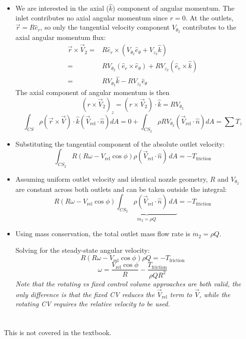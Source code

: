 ﻿\documentclass[12pt]{article}
\begin{document}
\begin{examplebox}
\begin{itemize}
\item We are interested in the axial ($\hat{k}$) component of angular momentum. The inlet contributes no axial angular momentum since $r=0$. At the outlets, $\vec{r}=R\hat{e}_r$, so only the tangential velocity component $V_{\theta_2}$ contributes to the axial angular momentum flux:
\begin{align*}
\vec r\times\vec V_2=&R\hat e_r\times(V_{\theta_2}\hat e_\theta+V_{z_2}\hat k)\\
=&RV_{\theta_2}(\hat e_r\times\hat e_\theta)+RV_{z_2}(\hat e_r\times\hat k)\\
=&RV_{\theta_2}\hat k-RV_{z_2}\hat e_\theta
\end{align*}
The axial component of angular momentum is then
\[(r\times\vec V_2)_z = (r\times\vec V_2)\cdot\hat{k} = RV_{\theta_2}\]
\[\int_{CS} \rho\left(\vec{r}\times\vec{V}\right)\cdot\hat{k}\left(\vec{V}_{\mathrm{rel}}\cdot\hat{n}\right)dA
=0+\int_{CS_2}\rho RV_{\theta_2}\left(\vec{V}_{\mathrm{rel}}\cdot\hat{n}\right)dA
=\sum T_z\]

\item Substituting the tangential component of the absolute outlet velocity:
\[\int_{CS_2} R(R\omega-V_{\mathrm{rel}}\cos\phi)\rho
(\vec{V}_{\mathrm{rel}}\cdot\hat{n})\,dA
=-T_{\mathrm{friction}}\]
    \item Assuming uniform outlet velocity and identical nozzle geometry, $R$ and $V_{\theta_2}$ are constant across both outlets and can be taken outside the integral:
\[R(R\omega-V_{\mathrm{rel}}\cos\phi)
\underbrace{\int_{CS_2}\rho
(\vec{V}_{\mathrm{rel}}\cdot\hat{n})\,dA}_{\dot{m}_2=\rho Q}
=-T_{\mathrm{friction}}\]
    \item Using mass conservation, the total outlet mass flow rate is $\dot{m}_2=\rho Q$. 
    
    Solving for the steady-state angular velocity:
\[R(R\omega-V_{\mathrm{rel}}\cos\phi)\rho Q
=-T_{\mathrm{friction}}\]
\[\boxed{\omega=\frac{V_{\mathrm{rel}}\cos\phi}{R}
-\frac{T_{\mathrm{friction}}}{\rho QR^2}}\]
\textit{Note that the rotating vs fixed control volume approaches are both valid, the only difference is that the fixed CV reduces the $\vec{V}_{\mathrm{rel}}$ term to $\vec{V}$, while the rotating CV requires the relative velocity to be used.}
\end{itemize}
\end{examplebox}
\newpage
\section*{}
This is not covered in the textbook.
\end{document}

